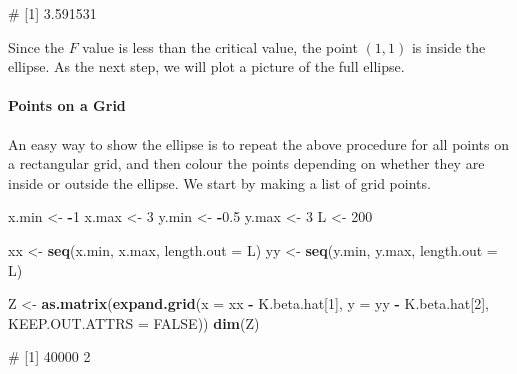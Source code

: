 \documentclass[
  a4paper,
]{article}
\newenvironment{Shaded}{\begin{snugshade}}{\end{snugshade}}
\newcommand{\AttributeTok}[1]{\textcolor[rgb]{0.13,0.29,0.53}{#1}}
\newcommand{\ConstantTok}[1]{\textcolor[rgb]{0.56,0.35,0.01}{#1}}
\newcommand{\DecValTok}[1]{\textcolor[rgb]{0.00,0.00,0.81}{#1}}
\newcommand{\FloatTok}[1]{\textcolor[rgb]{0.00,0.00,0.81}{#1}}
\newcommand{\FunctionTok}[1]{\textcolor[rgb]{0.13,0.29,0.53}{\textbf{#1}}}
\newcommand{\NormalTok}[1]{#1}
\newcommand{\OtherTok}[1]{\textcolor[rgb]{0.56,0.35,0.01}{#1}}
\newcommand{\SpecialCharTok}[1]{\textcolor[rgb]{0.81,0.36,0.00}{\textbf{#1}}}
\theoremstyle{definition}
\theoremstyle{definition}
\theoremstyle{definition}
\theoremstyle{definition}
\theoremstyle{remark}
\begin{document}
\begin{Shaded}
\begin{Highlighting}[]
\NormalTok{\# [1] 3.591531}
\end{Highlighting}
\end{Shaded}

Since the \(F\) value is less than the critical value, the point \((1, 1)\)
is inside the ellipse. As the next step, we will plot a picture of the
full ellipse.

\paragraph{Points on a Grid}\label{points-on-a-grid}

An easy way to show the ellipse is to repeat the above procedure for
all points on a rectangular grid, and then colour the points
depending on whether they are inside or outside the ellipse.
We start by making a list of grid points.

\begin{Shaded}
\begin{Highlighting}[]
\NormalTok{x.min }\OtherTok{\textless{}{-}} \SpecialCharTok{{-}}\DecValTok{1}
\NormalTok{x.max }\OtherTok{\textless{}{-}} \DecValTok{3}
\NormalTok{y.min }\OtherTok{\textless{}{-}} \SpecialCharTok{{-}}\FloatTok{0.5}
\NormalTok{y.max }\OtherTok{\textless{}{-}} \DecValTok{3}
\NormalTok{L }\OtherTok{\textless{}{-}} \DecValTok{200}

\NormalTok{xx }\OtherTok{\textless{}{-}} \FunctionTok{seq}\NormalTok{(x.min, x.max, }\AttributeTok{length.out =}\NormalTok{ L)}
\NormalTok{yy }\OtherTok{\textless{}{-}} \FunctionTok{seq}\NormalTok{(y.min, y.max, }\AttributeTok{length.out =}\NormalTok{ L)}

\NormalTok{Z }\OtherTok{\textless{}{-}} \FunctionTok{as.matrix}\NormalTok{(}\FunctionTok{expand.grid}\NormalTok{(}\AttributeTok{x =}\NormalTok{ xx }\SpecialCharTok{{-}}\NormalTok{ K.beta.hat[}\DecValTok{1}\NormalTok{],}
                           \AttributeTok{y =}\NormalTok{ yy }\SpecialCharTok{{-}}\NormalTok{ K.beta.hat[}\DecValTok{2}\NormalTok{],}
                           \AttributeTok{KEEP.OUT.ATTRS =} \ConstantTok{FALSE}\NormalTok{))}
\FunctionTok{dim}\NormalTok{(Z)}
\end{Highlighting}
\end{Shaded}

\begin{Shaded}
\begin{Highlighting}[]
\NormalTok{\# [1] 40000     2}
\end{Highlighting}
\end{Shaded}
\end{document}
